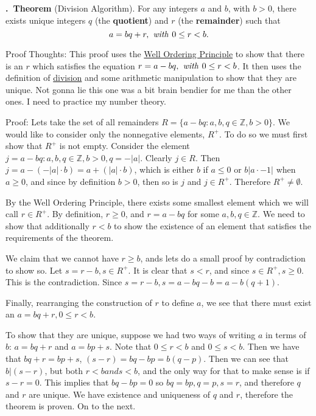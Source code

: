 \documentclass[12pt, oneside]{book}
\newcommand{\Integers}{\mathbb{Z}}
\newcounter{definition}[section]
\renewcommand\thedefinition{\thesection.\arabic{definition}}
\newcommand\define[1]{%
   \refstepcounter{definition}%
   \noindent\textbf{\thedefinition~#1}\label{def:\thedefinition}
}
\begin{document}
\define{Theorem} (Division Algorithm). For any integers \(a\) and \(b\), with \(b > 0\), there exists unique integers \(q\) (the \textbf{quotient}) and \(r\) (the \textbf{remainder}) such that \[a = bq + r, \text{\textit{ with }} 0 \leq r < b.\]

Proof Thoughts: This proof uses the \hyperref[def:1.1.2]{Well Ordering Principle} to show that there is an \(r\) which satisfies the equation \(r = a - bq, \text{\textit{ with }} 0 \leq r < b\). It then uses the definition of \hyperref[def:1.1.1]{division} and some arithmetic manipulation to show that they are unique. Not gonna lie this one was a bit brain bendier for me than the other ones. I need to practice my number theory.

Proof: Lets take the set of all remainders \(R = \{a - bq : a, b, q \in \Integers, b > 0\}\). We would like to consider only the nonnegative elements, \(R^+\). To do so we must first show that \(R^+\) is not empty. Consider the element \(j = a - bq: a, b, q\in \Integers, b > 0, q = -|a|\). Clearly \(j \in R\). Then \(j = a - (-|a| \cdot b) = a + (|a| \cdot b)\), which is either \(b\) if \(a \leq 0\) or \(b |a \cdot- 1|\) when \(a \geq 0\), and since by definition \( b > 0\), then so is \(j\) and \(j \in R^+\). Therefore \(R^+ \neq \emptyset\).

By the Well Ordering Principle, there exists some smallest element which we will call \(r \in R^+\). By definition, \(r \geq 0\), and \(r = a - bq\) for some \(a, b, q \in \Integers\). We need to show that additionally \(r < b\) to show the existence of an element that satisfies the requirements of the theorem.

We claim that we cannot have \( r \geq b\), ands lets do a small proof by contradiction to show so. Let \(s = r - b, s \in R^+\). It is clear that \(s < r\), and since \(s \in R^+, s \geq 0\). This is the contradiction. Since \(s = r - b, s = a - bq - b = a - b(q + 1)\).

Finally, rearranging the construction of \(r\) to define \(a\), we see that there must exist an \(a = bq + r, 0 \leq r < b\).

To show that they are unique, suppose we had two ways of writing \(a\) in terms of \(b\): \(a = bq + r \) and \(a = bp + s\). Note that \(0 \leq r < b\) and \(0 \leq s < b\). Then we have that \(bq + r = bp + s\), \((s - r) = bq - bp = b(q-p)\). Then we can see that \(b|(s-r)\), but both \(r < b and s < b\), and the only way for that to make sense is if \(s - r = 0\). This implies that \(bq - bp = 0\) so \(bq = bp, q = p, s = r\), and therefore \(q\) and  \(r\) are unique. We have existence and uniqueness of \(q\) and  \(r\), therefore the theorem is proven. On to the next.
\end{document}
